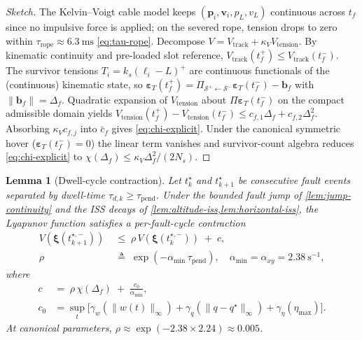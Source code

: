 \documentclass[lettersize,journal]{IEEEtran}
\newtheorem{lemma}{Lemma}%
\newcommand{\vect}[1]{\boldsymbol{#1}}
\begin{document}
\begin{proof}[Sketch]
The Kelvin--Voigt cable model keeps $(\vect p_i,\vect v_i,p_L,v_L)$ continuous across $t_f$ since no impulsive force is applied; on the severed rope, tension drops to zero within $\tau_{\mathrm{rope}}\approx\SI{6.3}{\milli\second}$ \eqref{eq:tau-rope}. Decompose $V=V_{\mathrm{track}}+\kappa_V V_{\mathrm{tension}}$. By kinematic continuity and pre-loaded slot reference, $V_{\mathrm{track}}(t_f^+)\le V_{\mathrm{track}}(t_f^-)$. The survivor tensions $T_i=k_s(\ell_i-L)^+$ are continuous functionals of the (continuous) kinematic state, so $\vect\varepsilon_T(t_f^+)=\Pi_{\mathcal{S}^+\leftarrow\mathcal{S}^-}\vect\varepsilon_T(t_f^-)-\vect b_f$ with $\|\vect b_f\|=\Delta_f$. Quadratic expansion of $V_{\mathrm{tension}}$ about $\Pi\vect\varepsilon_T(t_f^-)$ on the compact admissible domain yields $V_{\mathrm{tension}}(t_f^+)-V_{\mathrm{tension}}(t_f^-)\le c_{f,1}\Delta_f+c_{f,2}\Delta_f^2$. Absorbing $\kappa_V c_{f,j}$ into $\bar c_f$ gives \eqref{eq:chi-explicit}. Under the canonical symmetric hover ($\vect\varepsilon_T(t_f^-)=0$) the linear term vanishes and survivor-count algebra reduces \eqref{eq:chi-explicit} to $\chi(\Delta_f)\le\kappa_V\Delta_f^2/(2N_s)$.
\end{proof}

\begin{lemma}[Dwell-cycle contraction]
\label{lem:dwell-decay}
Let $t_k^\star$ and $t_{k+1}^\star$ be consecutive fault
events separated by dwell-time $\tau_{d,k} \ge
\tau_{\mathrm{pend}}$. Under the bounded fault jump of
\cref{lem:jump-continuity} and the ISS decays of
\cref{lem:altitude-iss,lem:horizontal-iss}, the Lyapunov
function satisfies a per-fault-cycle contraction
\begin{align}
  V(\vect\xi(t_{k+1}^{\star,-}))
    &\;\le\;
    \rho\,V(\vect\xi(t_k^{\star,-})) \;+\; c,
  \\
  \rho
    &\;\triangleq\;
    \exp\!\left(-\alpha_{\min}\,\tau_{\mathrm{pend}}\right),
  \quad \alpha_{\min} = \alpha_{xy} = \SI{2.38}{\second^{-1}},\nonumber
\end{align}
where
\begin{align}
\label{eq:c-def}
  c \;&=\; \rho\,\chi(\Delta_f) \;+\;
          \frac{c_0}{\alpha_{\min}},\\
  c_0 &= \sup_{t}\!
    \bigl[\gamma_w(\|w(t)\|_\infty)
          + \gamma_q(\|q - q^\star\|_\infty)
          + \gamma_\eta(\eta_{\max})\bigr].\nonumber
\end{align}
At canonical parameters, $\rho \approx
\exp(-2.38 \times 2.24) \approx 0.005$.
\end{lemma}
\end{document}
